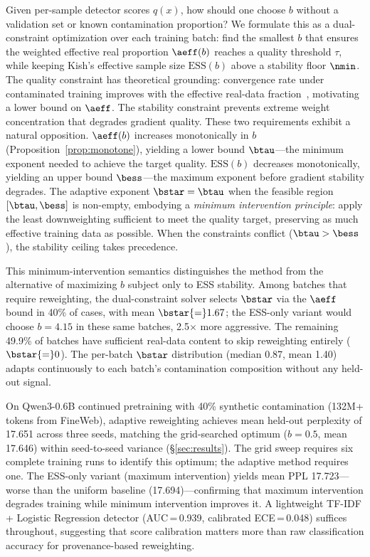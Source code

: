 Given per-sample detector scores $q(x)$, how should one choose $b$ without a validation set or known contamination proportion?
We formulate this as a dual-constraint optimization over each training batch: find the smallest $b$ that ensures the weighted effective real proportion $\aeff(b)$ reaches a quality threshold $\tau$, while keeping Kish's effective sample size $\mathrm{ESS}(b)$ above a stability floor $\nmin$.
The quality constraint has theoretical grounding: convergence rate under contaminated training improves with the effective real-data fraction~\citep{wang_2026_survive_contamination}, motivating a lower bound on $\aeff$.
The stability constraint prevents extreme weight concentration that degrades gradient quality.
These two requirements exhibit a natural opposition.
$\aeff(b)$ increases monotonically in $b$ (Proposition~\ref{prop:monotone}), yielding a lower bound $\btau$---the minimum exponent needed to achieve the target quality.
$\mathrm{ESS}(b)$ decreases monotonically, yielding an upper bound $\bess$---the maximum exponent before gradient stability degrades.
The adaptive exponent $\bstar = \btau$ when the feasible region $[\btau, \bess]$ is non-empty, embodying a \emph{minimum intervention principle}: apply the least downweighting sufficient to meet the quality target, preserving as much effective training data as possible.
When the constraints conflict ($\btau > \bess$), the stability ceiling takes precedence.

This minimum-intervention semantics distinguishes the method from the alternative of maximizing $b$ subject only to ESS stability.
Among batches that require reweighting, the dual-constraint solver selects $\bstar$ via the $\aeff$ bound in 40\% of cases, with mean $\bstar{=}1.67$; the ESS-only variant would choose $b{=}4.15$ in these same batches, 2.5$\times$ more aggressive.
The remaining 49.9\% of batches have sufficient real-data content to skip reweighting entirely ($\bstar{=}0$).
The per-batch $\bstar$ distribution (median 0.87, mean 1.40) adapts continuously to each batch's contamination composition without any held-out signal.

On Qwen3-0.6B continued pretraining with 40\% synthetic contamination (132M+ tokens from FineWeb), adaptive reweighting achieves mean held-out perplexity of 17.651 across three seeds, matching the grid-searched optimum ($b{=}0.5$, mean 17.646) within seed-to-seed variance (\S\ref{sec:results}).
The grid sweep requires six complete training runs to identify this optimum; the adaptive method requires one.
The ESS-only variant (maximum intervention) yields mean PPL 17.723---worse than the uniform baseline (17.694)---confirming that maximum intervention degrades training while minimum intervention improves it.
A lightweight TF-IDF + Logistic Regression detector (AUC\,=\,0.939, calibrated ECE\,=\,0.048) suffices throughout, suggesting that score calibration matters more than raw classification accuracy for provenance-based reweighting.

